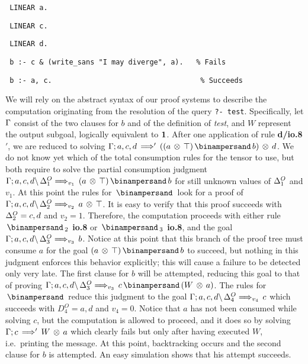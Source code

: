 {\tt \hspace*{2em} \indent LINEAR a.}

{\tt \hspace*{2em} \indent LINEAR c.}

{\tt \hspace*{2em} \indent LINEAR d.\rule[-2ex]{0ex}{1ex}}

{\tt \hspace*{2em} \indent b :- c  \& (write\_sans "I may diverge", a).
  \ \ \% Fails}

{\tt \hspace*{2em} \indent b :- a, c.\ \ \ \ \ \ \ \ \ \ \ \ \ \ \ \ \
  \ \ \ \ \ \ \ \ \ \ \ \ \ \ \ \ \ \ \% Succeeds\rule[-2ex]{0ex}{1ex}}

\medskip
\noindent
We will rely on the abstract syntax of our proof systems to describe the
computation originating from the resolution of the query {\tt ?- test}.
Specifically, let $\G$ consist of the two clauses for $b$ and of the
definition of {\em test}, and $W$ represent the output subgoal, logically
equivalent to $\One$. After one application of rule {\bf d/io.8$'$}, we are
reduced to solving $\ioVIIIa{\G;a,c,d}{((a \Times \Top) \With b) \Times d}$.
We do not know yet which of the total consumption rules for the tensor to
use, but both require to solve the partial consumption judgment
$\ioVIII{\G;a,c,d}{\D^O_1}{(a \Times \Top) \With b}{v_1}$ for still unknown
values of $\D^O_1$ and $v_1$.  At this point the rules for $\With$ look for a
proof of $\ioVIII{\G;a,c,d}{\D^O_2}{a \Times \Top}{v_2}$. It is easy to
verify that this proof succeeds with $\D^O_2 = c,d$ and $v_2 = 1$. Therefore,
the computation proceeds with either rule {\bf $\With_2$ io.8} or {\bf
  $\With_3$ io.8}, and the goal $\ioVIII{\G;a,c,d}{\D^O_3}{b}{v_3}$. Notice
at this point that this branch of the proof tree must consume $a$ for the
goal $(a \Times \Top) \With b$ to succeed, but nothing in this judgment
enforces this behavior explicitly; this will cause a failure to be detected
only very late. The first clause for $b$ will be attempted, reducing this
goal to that of proving $\ioVIII{\G;a,c,d}{\D^O_3}{c \With (W \Times
  a)}{v_3}$. The rules for $\With$ reduce this judgment to the goal
$\ioVIII{\G;a,c,d}{\D^O_4}{c}{v_4}$ which succeeds with $D^O_4 = a,d$ and
$v_4 = 0$. Notice that $a$ has not been consumed while solving $c$, but the
computation is allowed to proceed, and it does so by solving
$\ioVIIIa{\G;c}{W \Times a}$ which clearly fails but only after having
executed $W$, i.e.\ printing the message. At this point, backtracking occurs
and the second clause for $b$ is attempted. An easy simulation shows that his
attempt succeeds.

